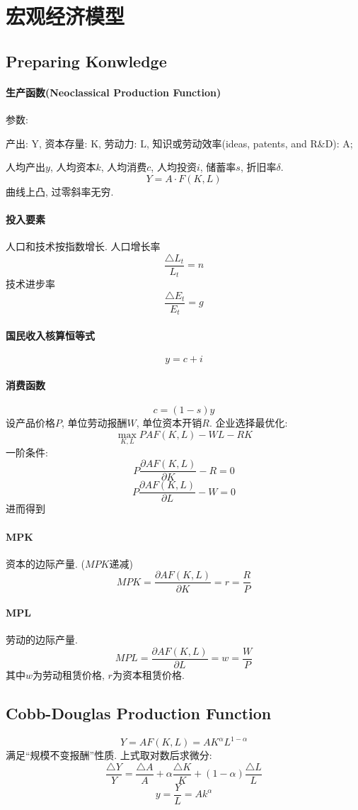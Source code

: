 \documentclass[UTF8, onecolumn, a4paper, 12pt]{article}
\begin{document}
\section{宏观经济模型}
\subsection{Preparing Konwledge}
\paragraph{生产函数(Neoclassical Production Function)}
参数:

产出: Y, 资本存量: K, 劳动力: L, 知识或劳动效率(ideas, patents, and R\&D): A; 

人均产出$y$, 人均资本$k$, 人均消费$c$, 人均投资$i$, 储蓄率$s$, 折旧率$\delta$.
$$Y = A\cdot F(K, L)$$
曲线上凸, 过零斜率无穷.
\paragraph{投入要素}
人口和技术按指数增长. 
人口增长率$$\frac{\triangle L_t}{L_t} = n$$ 技术进步率$$\frac{\triangle E_t}{E_t} = g$$
\paragraph{国民收入核算恒等式}
$$y = c + i$$
\paragraph{消费函数}
$$c = (1 - s)y$$
设产品价格$P$, 单位劳动报酬$W$, 单位资本开销$R$. 企业选择最优化:
$$\max_{K,L} PAF(K,L) - WL - RK$$
一阶条件:
$$P\frac{\partial AF(K,L)}{\partial K} - R = 0$$
$$P\frac{\partial AF(K,L)}{\partial L} - W = 0$$
进而得到
\paragraph{MPK}资本的边际产量. ($MPK$递减)
$$MPK = \frac{\partial AF(K,L)}{\partial K} = r = \frac{R}{P}$$
\paragraph{MPL}劳动的边际产量. 
$$MPL = \frac{\partial AF(K,L)}{\partial L} = w = \frac{W}{P}$$
其中$w$为劳动租赁价格, $r$为资本租赁价格. 
\subsection{Cobb-Douglas Production Function}
$$Y = AF(K, L) = AK^{\alpha}L^{1-\alpha}$$
满足“规模不变报酬”性质.  上式取对数后求微分:
$$\frac{\triangle Y}{Y} = \frac{\triangle A}{A} +\alpha \frac{\triangle K}{K} + (1 - \alpha)\frac{\triangle L}{L}$$
$$y = \frac{Y}{L} = Ak^{\alpha}$$
\end{document}
